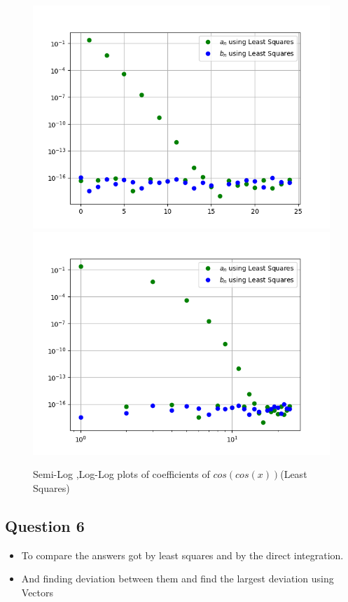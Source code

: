 \documentclass[11pt, a4paper]{article}
\begin{document}
\begin{figure}[!tbh]
     \centering
     \includegraphics[scale=0.7]{./../Extras/11.png}  
     \includegraphics[scale=0.7]{./../Extras/12.png}  
     \caption{Semi-Log ,Log-Log plots of coefficients of $cos(cos(x))$(Least Squares)}  
\end{figure}
\clearpage
\subsection{Question 6}\label{question-6}

\begin{itemize}
\item
  To compare the answers got by least squares and by the direct
  integration.
\item
  And finding deviation between them and find the largest deviation
  using Vectors
\end{itemize}
\end{document}
